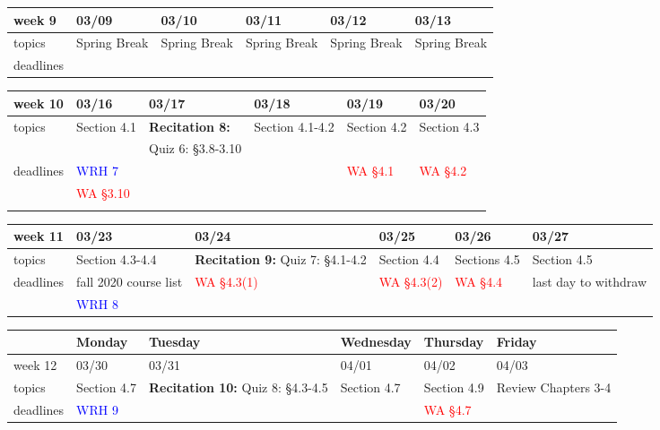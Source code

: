 \documentclass[11pt]{article}
\begin{document}
\begin{center}
\begin{tabularx}{\textwidth}{|p{1.5cm}|| L | L | L | L | L |}
\hline
week 9&03/09&03/10&03/11&03/12&03/13\\ \hline
topics &Spring Break&Spring Break&Spring Break&Spring Break&Spring Break\\
\hline 
deadlines&&&&&\\ \hline \end{tabularx} \end{center}

\begin{center}
\begin{tabularx}{\textwidth}{|p{1.5cm}|| L | L | L | L | L |}
\hline
week 10&03/16&03/17&03/18&03/19&03/20\\ \hline
topics&Section 4.1&\textbf{Recitation 8:}&Section 4.1-4.2&Section 4.2&Section 4.3\\ 
&&{Quiz 6}: \S 3.8-3.10&&&\\ \hline
deadlines& \textcolor{blue}{WRH 7}& &&\textcolor{red}{WA \S 4.1}&\textcolor{red}{WA \S 4.2} \\ 
&\textcolor{red}{WA \S 3.10}&&&&\\
&&&&&\\ \hline \end{tabularx} \end{center}

\begin{center}
\begin{tabularx}{\textwidth}{|p{1.5cm}|| L | L | L | L | L |}
\hline
week 11&03/23&03/24&03/25&03/26&03/27\\ \hline
topics&Section 4.3-4.4&\textbf{Recitation 9:} {Quiz 7}: \S4.1-4.2&Section 4.4&Sections 4.5&Section 4.5\\ 
\hline
deadlines&\textcolor{ddgreen}{fall 2020 course list}&\textcolor{red}{WA \S 4.3(1)}&\textcolor{red}{WA \S 4.3(2)}&\textcolor{red}{WA \S 4.4}&\textcolor{ddgreen}{last day to withdraw} \\
&\textcolor{blue}{WRH 8}&&&&\\
 \hline  \end{tabularx} \end{center}
 
 \newpage
 
 \begin{center}
\begin{tabularx}{\textwidth}{|p{1.5cm}|| L | L | L | L | L |}
\hline
&Monday & Tuesday & Wednesday & Thursday & Friday \\
\hline 
week 12&03/30&03/31&04/01&04/02&04/03\\ \hline
topics&Section 4.7&\textbf{Recitation 10:}  {Quiz 8}: \S4.3-4.5&Section 4.7&Section 4.9&Review Chapters 3-4\\ 
\hline
deadlines&\textcolor{blue}{WRH 9}& &&\textcolor{red}{WA \S 4.7}&\\ \hline
\end{tabularx} \end{center}
\end{document}
